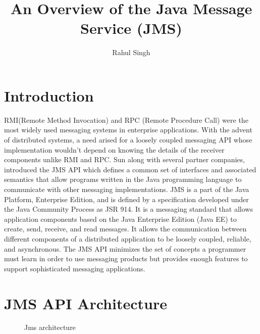 \documentclass[9pt,twocolumn,twoside]{styles/osajnl}
\title{An Overview of the Java Message Service (JMS)}
\author[1]{Rahul Singh}
\affil[1]{School of Informatics and Computing, Bloomington, IN 47408, U.S.A.}
\affil[*]{Corresponding authors: rahpsing@iu.edu}
\begin{document}
\maketitle

\section{Introduction}

RMI(Remote Method Invocation) and RPC (Remote Procedure Call) were the
most widely used messaging systems in enterprise applications. With
the advent of distributed systems, a need arised for a loosely coupled
messaging API whose implementation wouldn't depend on knowing the
details of the receiver components unlike RMI and RPC. Sun along with
several partner companies, introduced the JMS API which defines a
common set of interfaces and associated semantics that allow programs
written in the Java programming language to communicate with other
messaging implementations. JMS is a part of the Java Platform,
Enterprise Edition, and is defined by a specification developed under
the Java Community Process as JSR 914. \cite{www-jms-javajsr}  It is a messaging standard
that allows application components based on the Java Enterprise
Edition (Java EE) to create, send, receive, and read messages. It
allows the communication between different components of a distributed
application to be loosely coupled, reliable, and asynchronous. \cite{www-jms-oracle} The
JMS API minimizes the set of concepts a programmer must learn in order
to use messaging products but provides enough features to support
sophisticated messaging applications.

\section{JMS API Architecture}

\begin{figure}[htbp]
\centering
{}
\caption{\cite{www-jms-tutorialoracle} Jms architecture}
\label{fig:JMS Objects}
\end{figure}
\end{document}
